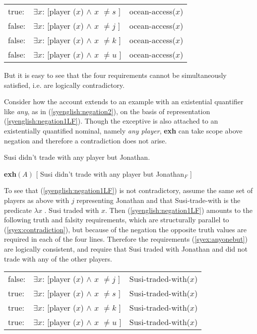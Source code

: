 \documentclass[output=paper]{langscibook}
\begin{document}
\ea \label{syex:contradiction}
    \begin{tabular}[t]{@{}l@{~}l@{~$\land$~}l@{}}
    true:  &  $\exists x$: [player ($x$) $\land$ $x$ $\neq s$ ] & ocean-access($x$)\\
    false: &  $\exists x$: [player ($x$) $\land$ $x$ $\neq j$ ] & ocean-access($x$)\\
    false: &  $\exists x$: [player ($x$) $\land$ $x$ $\neq k$ ] & ocean-access($x$)\\
    false: &  $\exists x$: [player ($x$) $\land$ $x$ $\neq u$ ] & ocean-access($x$)\\
    \end{tabular}
\z

But it is easy to see that the four requirements cannot be simultaneously satisfied, i.e.  are logically contradictory.

Consider how the account extends to an example with an existential quantifier like \emph{any}, as in (\ref{syenglish:negation2}),  on the basis of representation (\ref{syenglish:negation1LF}).
Though the exceptive is also attached to an existentially quantified nominal, namely \emph{any player}, \textbf{exh} can take scope above negation and therefore a contradiction does not arise.

\ea \label{syenglish:negation2} 
Susi didn't trade with any player but Jonathan.

\ex \label{syenglish:negation1LF}
\textbf{exh}$(A)$ [ Susi didn't trade with any player but Jonathan$_F$ ]\z


To see that (\ref{syenglish:negation1LF}) is not contradictory, assume the same set of players as above with $j$ representing Jonathan and that Susi-trade-with is the predicate $\lambda x$ . Susi traded with $x$.  Then (\ref{syenglish:negation1LF}) amounts to the following truth and falsity requirements, which are structurally parallel to (\ref{syex:contradiction}), but because of the negation the opposite truth values are required in each of the four lines.  Therefore the requirements (\ref{syex:anyonebut}) are logically consistent, and require that Susi traded with Jonathan and did not trade with any of the other players.

\ea \label{syex:anyonebut}
    \begin{tabular}[t]{@{}l@{~}l@{~$\land$~}l@{}}
    false: & $\exists x$: [player ($x$) $\land$ $x$ $\neq j$ ] & Susi-traded-with($x$)\\
    true:  & $\exists x$: [player ($x$) $\land$ $x$ $\neq s$ ] & Susi-traded-with($x$)\\
    true:  & $\exists x$: [player ($x$) $\land$ $x$ $\neq k$ ] & Susi-traded-with($x$)\\
    true:  & $\exists x$: [player ($x$) $\land$ $x$ $\neq u$ ] & Susi-traded-with($x$)\\
    \end{tabular}
\z
\end{document}
